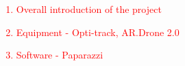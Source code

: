 \textcolor{red}{ 
\begin{enumerate}
	\item Overall introduction of the project
	\item Equipment - Opti-track, AR.Drone 2.0
	\item Software - Paparazzi
\end{enumerate}
}